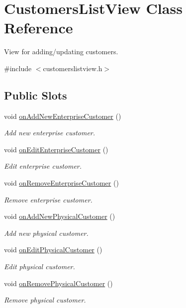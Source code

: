 \hypertarget{class_customers_list_view}{\section{\-Customers\-List\-View \-Class \-Reference}
\label{class_customers_list_view}
}


\-View for adding/updating customers.  




{\ttfamily \#include $<$customerslistview.\-h$>$}

\subsection*{\-Public \-Slots}
\begin{DoxyCompactItemize}
\item 
void \hyperlink{class_customers_list_view_aab89c6bea432c766951120c8f7c28034}{on\-Add\-New\-Enterprise\-Customer} ()
\begin{DoxyCompactList}\small\item\em \-Add new enterprise customer. \end{DoxyCompactList}\item 
void \hyperlink{class_customers_list_view_aabca2b40633c712584299bad5b8be736}{on\-Edit\-Enterprise\-Customer} ()
\begin{DoxyCompactList}\small\item\em \-Edit enterprise customer. \end{DoxyCompactList}\item 
void \hyperlink{class_customers_list_view_a5bdf9b2bda1c3bec0050f5435339d015}{on\-Remove\-Enterprise\-Customer} ()
\begin{DoxyCompactList}\small\item\em \-Remove enterprise customer. \end{DoxyCompactList}\item 
void \hyperlink{class_customers_list_view_a6ae9fcbdc916c7ba7f664b5f79514f36}{on\-Add\-New\-Physical\-Customer} ()
\begin{DoxyCompactList}\small\item\em \-Add new physical customer. \end{DoxyCompactList}\item 
void \hyperlink{class_customers_list_view_a3d36e95d829f6fb561c85d6130d1f83a}{on\-Edit\-Physical\-Customer} ()
\begin{DoxyCompactList}\small\item\em \-Edit physical customer. \end{DoxyCompactList}\item 
void \hyperlink{class_customers_list_view_ac48c5529fed3eefce5b955a92a90ba91}{on\-Remove\-Physical\-Customer} ()
\begin{DoxyCompactList}\small\item\em \-Remove physical customer. \end{DoxyCompactList}\end{DoxyCompactItemize}
